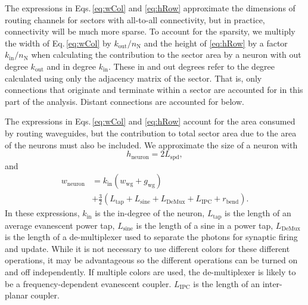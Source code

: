 \documentclass[aip,amsmath,amssymb,reprint,nofootinbib]{revtex4-1}
\begin{document}
The expressions in Eqs.\,\ref{eq:wCol} and \ref{eq:hRow} approximate the dimensions of routing channels for sectors with all-to-all connectivity, but in practice, connectivity will be much more sparse. To account for the sparsity, we multiply the width of Eq.\,\ref{eq:wCol} by $k_{\mathrm{out}}/n_{\mathrm{N}}$ and the height of \ref{eq:hRow} by a factor $k_{\mathrm{in}}/n_{\mathrm{N}}$ when calculating the contribution to the sector area by a neuron with out degree $k_{\mathrm{out}}$ and in degree $k_{\mathrm{in}}$. These in and out degrees refer to the degree calculated using only the adjacency matrix of the sector. That is, only connections that originate and terminate within a sector are accounted for in this part of the analysis. Distant connections are accounted for below.

The expressions in Eqs.\,\ref{eq:wCol} and \ref{eq:hRow} account for the area consumed by routing waveguides, but the contribution to total sector area due to the area of the neurons must also be included. We approximate the size of a neuron with
\begin{equation}
\label{eq:hNeuron}
h_{\mathrm{neuron}} = 2L_{\mathrm{spd}},
\end{equation}
and
\begin{equation}
\label{eq:wNeuron}
\begin{split}
w_{\mathrm{neuron}} &= k_{\mathrm{in}}(w_{\mathrm{wg}}+g_{\mathrm{wg}})\\
&+\frac{3}{2}(L_{\mathrm{tap}}+L_{\mathrm{sine}}+L_{\mathrm{DeMux}}+L_{\mathrm{IPC}}+r_{\mathrm{bend}}).
\end{split}
\end{equation}
In these expressions, $k_{\mathrm{in}}$ is the in-degree of the neuron, $L_{\mathrm{tap}}$ is the length of an average evanescent power tap, $L_{\mathrm{sine}}$ is the length of a sine in a power tap, $L_{\mathrm{DeMux}}$ is the length of a de-multiplexer used to separate the photons for synaptic firing and update. While it is not necessary to use different colors for these different operations, it may be advantageous so the different operations can be turned on and off independently. If multiple colors are used, the de-multiplexer is likely to be a frequency-dependent evanescent coupler. $L_{\mathrm{IPC}}$ is the length of an inter-planar coupler.
\end{document}
